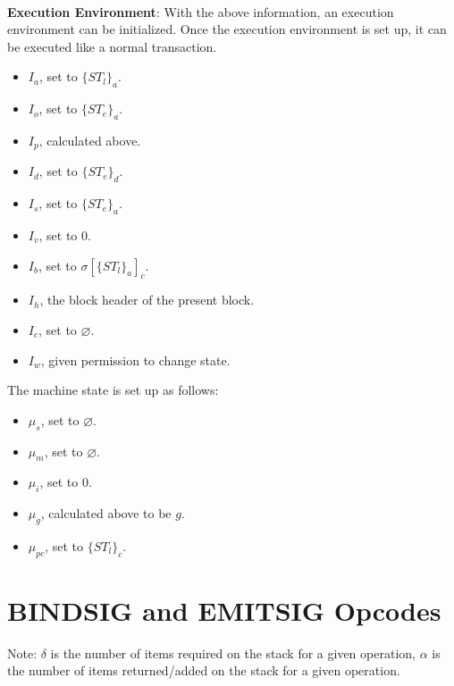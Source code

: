 \documentclass{article}
\begin{document}
\\
\textbf{Execution Environment}: With the above information, an execution environment can be initialized. Once the execution environment is set up, it can be executed like a normal transaction.
\begin{itemize}
    \item $I_a$, set to $\{ST_l\}_a$.
    \item $I_o$, set to $\{ST_e\}_a$.
    \item $I_p$, calculated above.
    \item $I_d$, set to $\{ST_e\}_d$.
    \item $I_s$, set to $\{ST_e\}_a$.
    \item $I_v$, set to $0$.
    \item $I_b$, set to $\sigma[\{ST_l\}_a]_c$.
    \item $I_h$, the block header of the present block.
    \item $I_c$, set to $\varnothing$.
    \item $I_w$, given permission to change state.
\end{itemize}
The machine state is set up as follows:
\begin{itemize}
    \item $\mu_s$, set to $\varnothing$.
    \item $\mu_m$, set to $\varnothing$.
    \item $\mu_i$, set to $0$.
    \item $\mu_g$, calculated above to be $g$.
    \item $\mu_{pc}$, set to $\{ST_l\}_c$.
\end{itemize}


\newpage
\section{BINDSIG and EMITSIG Opcodes}
Note: $\delta$ is the number of items required on the stack for a given operation, $\alpha$ is the number of items returned/added on the stack for a given operation. 
\end{document}
